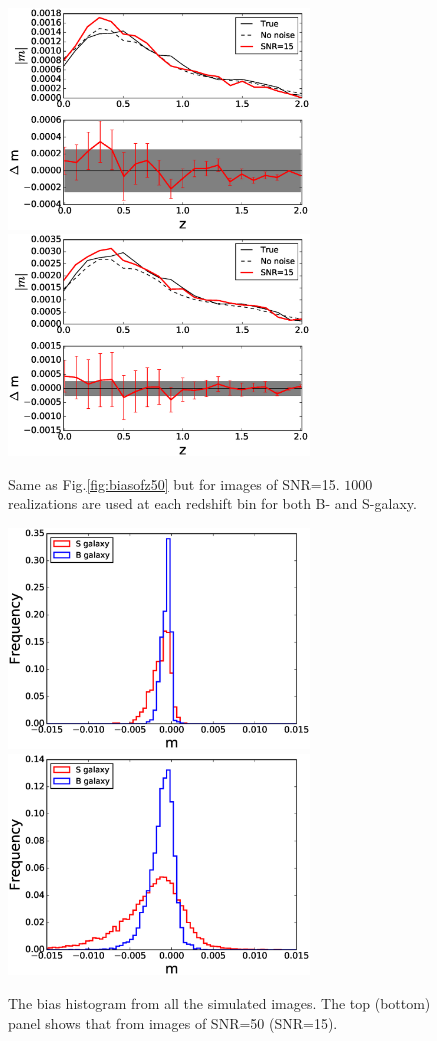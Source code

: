 \documentclass[useAMS,usenatbib]{mnras}
\begin{document}
\begin{figure}
  \includegraphics[width=8.0cm]{zs2n_b_snrtt15.eps}
  \includegraphics[width=8.0cm]{zs2n_s_snrtt15.eps}
\caption{Same as Fig.\ref{fig:biasofz50} but for images of SNR=15.
  $1000$ realizations are used at each redshift bin for both B- and
  S-galaxy.}
\label{fig:biasofz15}
\end{figure}
%


\begin{figure}
  \includegraphics[width=8.0cm]{zs2n50his.eps}
  \includegraphics[width=8.0cm]{zs2n15his.eps}
  \caption{The bias histogram from all the simulated images. The top
    (bottom) panel shows that from images of SNR=50 (SNR=15).  }
  \label{fig:biasofzhis}
\end{figure}
%
\end{document}
